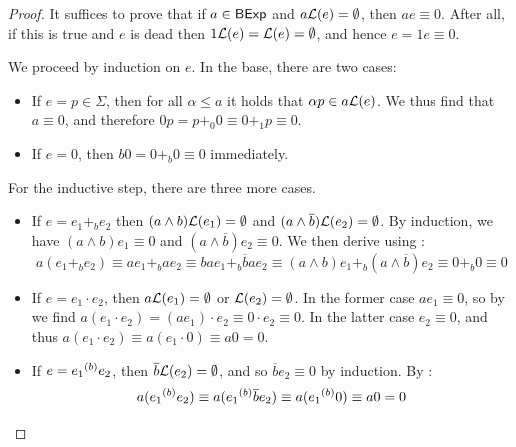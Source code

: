 \documentclass[orivec,envcountsect,envcountsame]{llncs}
\begin{document}
\lemdeadequalszero*
\begin{proof}
	It suffices to prove that if $a \in \mathsf{BExp}$ and $a\mathcal{L}(e) = \emptyset$, then $ae \equiv 0$.
	After all, if this is true and $e$ is dead then $1\mathcal{L}(e) = \mathcal{L}(e) = \emptyset$, and hence $e = 1e \equiv 0$.

	We proceed by induction on $e$.
	In the base, there are two cases:
	\begin{itemize}
		\item
		If $e = p \in \Sigma$, then for all $\alpha \leq a$ it holds that $\alpha{} p \in a\mathcal{L}(e)$.
		We thus find that $a \equiv 0$, and therefore $0p = p +_0 0 \equiv 0 +_1 p \equiv 0$.

		\item
		If $e = 0$, then $b0 = 0 +_b 0 \equiv 0$ immediately.
	\end{itemize}
	For the inductive step, there are three more cases.
	\begin{itemize}
		\item
		If $e = e_1 +_b e_2$ then $(a \wedge b)\mathcal{L}(e_1) = \emptyset$ and $(a \wedge \overline{b})\mathcal{L}(e_2) = \emptyset$.
		By induction, we have $(a \wedge b)e_1 \equiv 0$ and $(a \wedge \overline{b})e_2 \equiv 0$.
		We then derive using :
		\[
		a(e_1 +_b e_2)
		\equiv ae_1 +_b ae_2
		\equiv bae_1 +_b \overline{b}ae_2
		\equiv (a \wedge b)e_1 +_b (a \wedge \overline{b})e_2
		\equiv 0 +_b 0
		\equiv 0
		\]

		\item
		If $e = e_1 \cdot e_2$, then $a\mathcal{L}(e_1) = \emptyset$ or $\mathcal{L}(e_2) = \emptyset$.
		In the former case $ae_1 \equiv 0$, so by  we find
		\(
		a(e_1 \cdot e_2)
		= (ae_1) \cdot e_2
		\equiv 0 \cdot e_2
		\equiv 0
		\).
		In the latter case $e_2 \equiv 0$, and thus $a(e_1 \cdot e_2) \equiv a(e_1 \cdot 0) \equiv a0 = 0$.

		\item
		If $e = e_1 {\mathbin{^{(b)}}} e_2$, then $\overline{b}\mathcal{L}(e_2) = \emptyset$, and so $\overline{b}e_2 \equiv 0$ by induction.
		By :
		\[
		a(e_1 {\mathbin{^{(b)}}} e_2)
		\equiv a(e_1 {\mathbin{^{(b)}}} \overline{b}e_2)
		\equiv a(e_1 {\mathbin{^{(b)}}} 0)
		\equiv a0
		= 0
		\]
	\end{itemize}
\end{proof}
\end{document}
